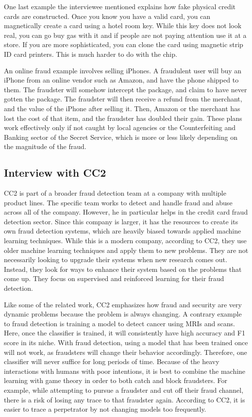 \documentclass[midd]{thesis}
\begin{document}
One last example the interviewee mentioned explains how fake physical credit cards are constructed. Once you know you have a valid card, you can magnetically create a card using a hotel room key. While this key does not look real, you can go buy gas with it and if people are not paying attention use it at a store. If you are more sophisticated, you can clone the card using magnetic strip ID card printers. This is much harder to do with the chip.

An online fraud example involves selling iPhones. A fraudulent user will buy an iPhone from an online vendor such as Amazon, and have the phone shipped to them. The fraudster will somehow intercept the package, and claim to have never gotten the package. The fraudster will then receive a refund from the merchant, and the value of the iPhone after selling it. Then, Amazon or the merchant has lost the cost of that item, and the fraudster has doubled their gain. These plans work effectively only if not caught by local agencies or the Counterfeiting and Banking sector of the Secret Service, which is more or less likely depending on the magnitude of the fraud. 

\subsection{Interview with CC2}

CC2 is part of a broader fraud detection team at a company with multiple product lines. The specific team works to detect and handle fraud and abuse across all of the company. However, he in particular helps in the credit card fraud detection sector. Since this company is larger, it has the resources to create its own fraud detection systems, which are heavily biased towards applied machine learning techniques. While this is a modern company, according to CC2, they use older machine learning techniques and apply them to new problems. They are not necessarily looking to upgrade their systems when new research comes out. Instead, they look for ways to enhance their system based on the problems that come up. They focus on supervised and reinforced learning for their fraud detection.

Like some of the related work, CC2 emphasizes how fraud and security are very dynamic problems because the problem is always changing. A contrary example to fraud detection is training a model to detect cancer using MRIs and scans. Here, once the classifier is trained, it will consistently have high accuracy and F1 score in its niche. With fraud detection, using a model that has been trained once will not work, as fraudsters will change their behavior accordingly. Therefore, one classifier will never suffice for long periods of time. Because of the heavy interactions with humans with poor intentions, it is best to combine the machine learning with game theory in order to both catch and block fraudsters. For example, while attempting to pursue a fraudster and cut off their fraud channel, there is a risk of losing any trace to that fraudster again. According to CC2, it is easier to trace a perpetrator by not changing models too frequently.
\end{document}

